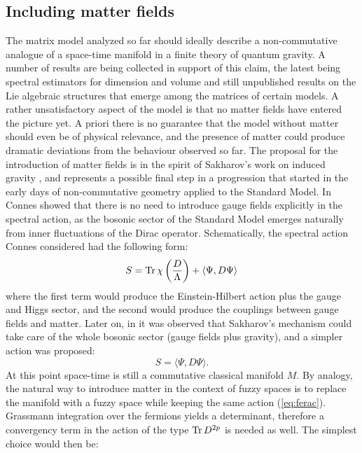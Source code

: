\subsection{Including matter fields}
The matrix model analyzed so far should ideally describe a non-commutative analogue of a space-time manifold in a finite theory of quantum gravity. A number of results are being collected in support of this claim, the latest being spectral estimators for dimension and volume \cite{barrdruceglaser} and still unpublished results on the Lie algebraic structures that emerge among the matrices of certain models.\newline
A rather unsatisfactory aspect of the model is that no matter fields have entered the picture yet. A priori there is no guarantee that the model without matter should even be of physical relevance, and the presence of matter could produce dramatic deviations from the behaviour observed so far.\newline
The proposal for the introduction of matter fields is in the spirit of Sakharov's work on induced gravity \cite{sak}, and represents a possible final step in a progression that started in the early days of non-commutative geometry applied to the Standard Model. In \cite{connesGRAVMAT} Connes showed that there is no need to introduce gauge fields explicitly in the spectral action, as the bosonic sector of the Standard Model emerges naturally from inner fluctuations of the Dirac operator. Schematically, the spectral action Connes considered had the following form:
\begin{equation}
S = \operatorname{Tr} \chi \left( \frac{D}{\Lambda} \right) + \langle \Psi, D \Psi \rangle
\end{equation}
where the first term would produce the Einstein-Hilbert action plus the gauge and Higgs sector, and the second would produce the couplings between gauge fields and matter. Later on, in \cite{barrettIND} it was observed that Sakharov's mechanism could take care of the whole bosonic sector (gauge fields plus gravity), and a simpler action was proposed:
\begin{equation}\label{eq:ferac}
S = \langle \Psi, D \Psi \rangle.
\end{equation}
At this point space-time is still a commutative classical manifold $M$. By analogy, the natural way to introduce matter in the context of fuzzy spaces is to replace the manifold with a fuzzy space while keeping the same action (\ref{eq:ferac}). Grassmann integration over the fermions yields a determinant, therefore a convergency term in the action of the type $\operatorname{Tr} D^{2p}$ is needed as well. The simplest choice would then be:
